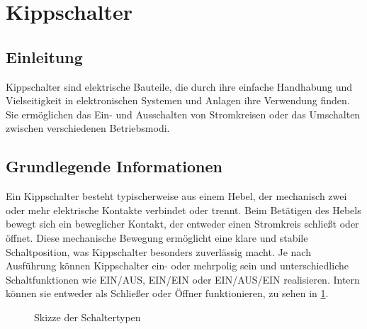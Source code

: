 \section{Kippschalter}
\subsection{Einleitung}
Kippschalter sind elektrische Bauteile, die durch ihre einfache Handhabung und Vielseitigkeit in elektronischen Systemen und Anlagen ihre Verwendung finden. Sie ermöglichen das Ein- und Ausschalten von Stromkreisen oder das Umschalten zwischen verschiedenen Betriebsmodi. 
\cite{NKKswitches:2025} \cite{Indicatorlight:2025}

\subsection{Grundlegende Informationen}
Ein Kippschalter besteht typischerweise aus einem Hebel, der mechanisch zwei oder mehr elektrische Kontakte verbindet oder trennt. Beim Betätigen des Hebels bewegt sich ein beweglicher Kontakt, der entweder einen Stromkreis schließt oder öffnet. Diese mechanische Bewegung ermöglicht eine klare und stabile Schaltposition, was Kippschalter besonders zuverlässig macht. Je nach Ausführung können Kippschalter ein- oder mehrpolig sein und unterschiedliche Schaltfunktionen wie EIN/AUS, EIN/EIN oder EIN/AUS/EIN realisieren. Intern können sie entweder als Schließer oder Öffner funktionieren, zu sehen in \ref{skizzeSchalter}.\cite{NKKswitches:2025} \cite{Indicatorlight:2025}

\begin{figure}[H]
	\centering
	\caption{Skizze der Schaltertypen}
	\label{skizzeSchalter}
\end{figure}

